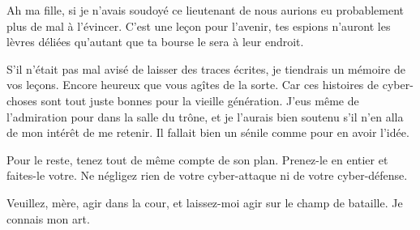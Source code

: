 \scene

\StageDirII{\reine, \princesse}

\begin{drama}
  \reinespeaks Ah ma fille, si je n’avais soudoyé ce lieutenant de \general{} nous aurions eu probablement plus de mal à l’évincer. C’est une leçon pour l’avenir, 
  tes espions n’auront les lèvres déliées qu’autant que ta bourse le sera à leur endroit.

  \princessespeaks S’il n’était pas mal avisé de laisser des traces écrites, je tiendrais un mémoire de vos leçons. Encore heureux que vous agîtes de la sorte. Car ces histoires de cyber-choses sont tout juste bonnes pour la vieille génération. J’eus même de l’admiration pour  \elena{} dans la salle du trône, et je l’aurais bien soutenu s’il n’en alla de mon intérêt de me retenir. Il fallait bien un sénile comme \general{} pour en avoir l’idée.

  \reinespeaks Pour le reste, tenez tout de même compte de son plan. Prenez-le en entier et faites-le votre. Ne négligez rien de votre cyber-attaque ni de votre cyber-défense.

  \princessespeaks Veuillez, mère, agir dans la cour, et laissez-moi agir sur le champ de bataille. Je connais mon art.
\end{drama}

\scene

\StageDirII{\elena, \alexas}



